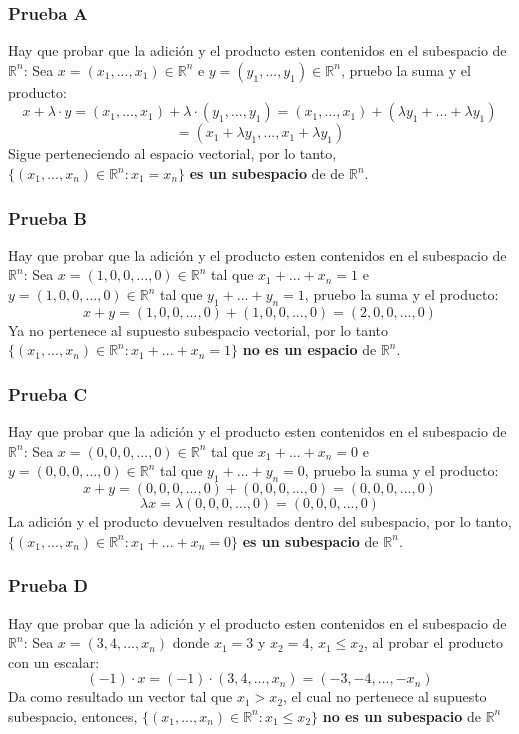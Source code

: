 \documentclass[a4paper,12pt]{article}
\begin{document}
\subsubsection{Prueba A}
Hay que probar que la adición y el producto esten contenidos en el subespacio de $\mathds{R}^n$:
\newline Sea $x=(x_1,...,x_1)\in\mathds{R}^n$ e $y=(y_1,...,y_1)\in\mathds{R}^n$, pruebo la suma y el producto:
$$
x + \lambda\cdot y = (x_1,...,x_1) + \lambda \cdot (y_1,...,y_1) = (x_1,...,x_1) + (\lambda y_1 + ... + \lambda y_1)
$$
$$
= (x_1+\lambda y_1 , ... , x_1 + \lambda y_1)
$$
Sigue perteneciendo al espacio vectorial, por lo tanto, $\{ (x_1,...,x_n) \in  \mathds{R}^n : x_1=x_n\}$ \textbf{es un subespacio} de de $\mathds{R}^n$.
\subsubsection{Prueba B}
Hay que probar que la adición y el producto esten contenidos en el subespacio de $\mathds{R}^n$:
\newline Sea $x=(1,0,0,...,0)\in\mathds{R}^n$ tal que $x_1+...+x_n=1$ e $y=(1,0,0,...,0)\in\mathds{R}^n$ tal que $y_1+...+y_n=1$, pruebo la suma y el producto:
$$
x + y = (1,0,0,...,0) + (1,0,0,...,0) = (2,0,0,...,0) 
$$
Ya no pertenece al supuesto subespacio vectorial, por lo tanto $\{ (x_1,...,x_n) \in  \mathds{R}^n : x_1+...+x_n=1 \}$ \textbf{no es un espacio}
de $\mathds{R}^n$.
\subsubsection{Prueba C}
Hay que probar que la adición y el producto esten contenidos en el subespacio de $\mathds{R}^n$:
\newline Sea $x=(0,0,0,...,0)\in\mathds{R}^n$ tal que $x_1+...+x_n=0$ e $y=(0,0,0,...,0)\in\mathds{R}^n$ tal que $y_1+...+y_n=0$, pruebo la suma y el producto:
$$
x + y = (0,0,0,...,0) + (0,0,0,...,0) = (0,0,0,...,0) 
$$
$$
\lambda x = \lambda (0,0,0,...,0) = (0,0,0,...,0) 
$$
La adición y el producto devuelven resultados dentro del subespacio, por lo tanto, $\{ (x_1,...,x_n) \in  \mathds{R}^n : x_1+...+x_n=0 \}$ \textbf{es un subespacio} de $\mathds{R}^n$.
\subsubsection{Prueba D}
Hay que probar que la adición y el producto esten contenidos en el subespacio de $\mathds{R}^n$: \newline
Sea $x=(3,4,...,x_n)$ donde $x_1=3$ y $x_2=4$, $x_1\leq x_2$, al probar el producto con un escalar:
$$
(-1)\cdot x = (-1) \cdot (3,4,...,x_n) = (-3,-4,...,-x_n)
$$
Da como resultado un vector tal que $x_1>x_2$, el cual no pertenece al supuesto subespacio, entonces, $\{ (x_1,...,x_n) \in  \mathds{R}^n : x_1 \leq x_2 \}$ \textbf{no es un subespacio} de $\mathds{R}^n$
\end{document}
